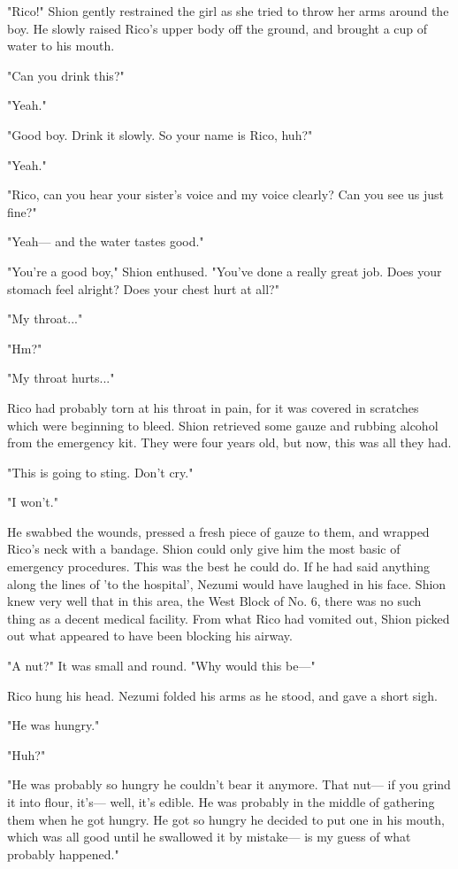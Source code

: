 "Rico!" Shion gently restrained the girl as she tried to throw her arms
around the boy. He slowly raised Rico's upper body off the ground, and
brought a cup of water to his mouth.

"Can you drink this?"

"Yeah."

"Good boy. Drink it slowly. So your name is Rico, huh?"

"Yeah."

"Rico, can you hear your sister's voice and my voice clearly? Can you
see us just fine?"

"Yeah--- and the water tastes good."

"You're a good boy," Shion enthused. "You've done a really great job.
Does your stomach feel alright? Does your chest hurt at all?"

"My throat..."

"Hm?"

"My throat hurts..."

Rico had probably torn at his throat in pain, for it was covered in
scratches which were beginning to bleed. Shion retrieved some gauze and
rubbing alcohol from the emergency kit. They were four years old, but
now, this was all they had.

"This is going to sting. Don't cry."

"I won't."

He swabbed the wounds, pressed a fresh piece of gauze to them, and
wrapped Rico's neck with a bandage. Shion could only give him the most
basic of emergency procedures. This was the best he could do. If he had
said anything along the lines of 'to the hospital', Nezumi would have
laughed in his face. Shion knew very well that in this area, the West
Block of No. 6, there was no such thing as a decent medical facility.
From what Rico had vomited out, Shion picked out what appeared to have
been blocking his airway.

"A nut?" It was small and round. "Why would this be---"

Rico hung his head. Nezumi folded his arms as he stood, and gave a short
sigh.

"He was hungry."

"Huh?"

"He was probably so hungry he couldn't bear it anymore. That nut--- if you
grind it into flour, it's--- well, it's edible. He was probably in the
middle of gathering them when he got hungry. He got so hungry he decided
to put one in his mouth, which was all good until he swallowed it by
mistake--- is my guess of what probably happened."

